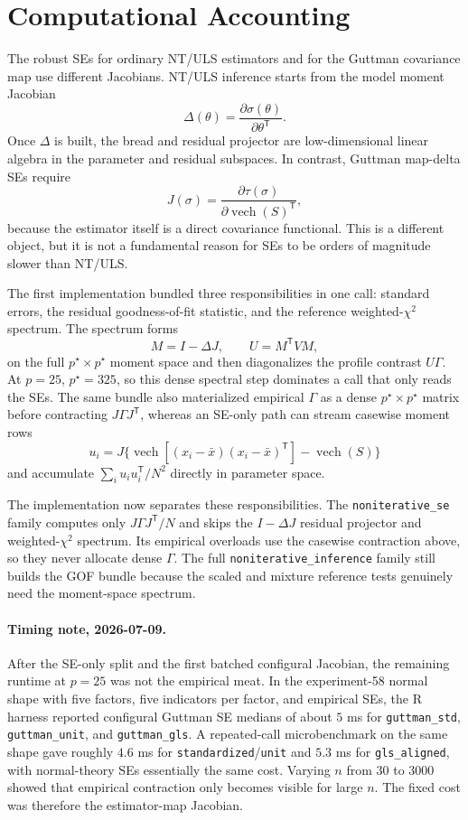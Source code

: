\documentclass[11pt]{article}
\newcommand{\T}{^{\mathsf T}}
\newcommand{\vech}{\operatorname{vech}}
\theoremstyle{plain}
\theoremstyle{remark}
\begin{document}
\section{Computational Accounting}

The robust SEs for ordinary NT/ULS estimators and for the Guttman covariance
map use different Jacobians. NT/ULS inference starts from the model moment
Jacobian
\[
  \Delta(\theta)=\frac{\partial\sigma(\theta)}{\partial\theta\T}.
\]
Once \(\Delta\) is built, the bread and residual projector are low-dimensional
linear algebra in the parameter and residual subspaces. In contrast, Guttman
map-delta SEs require
\[
  J(\sigma)=\frac{\partial\tau(\sigma)}{\partial\vech(S)\T},
\]
because the estimator itself is a direct covariance functional. This is a
different object, but it is not a fundamental reason for SEs to be orders of
magnitude slower than NT/ULS.

The first implementation bundled three responsibilities in one call:
standard errors, the residual goodness-of-fit statistic, and the reference
weighted-\(\chi^2\) spectrum. The spectrum forms
\[
  M = I-\Delta J,\qquad U=M\T V M,
\]
on the full \(p^\star\times p^\star\) moment space and then diagonalizes the
profile contrast \(U\Gamma\). At \(p=25\), \(p^\star=325\), so this dense
spectral step dominates a call that only reads the SEs. The same bundle also
materialized empirical \(\Gamma\) as a dense \(p^\star\times p^\star\) matrix
before contracting \(J\Gamma J\T\), whereas an SE-only path can stream
casewise moment rows
\[
  u_i = J\{\vech[(x_i-\bar x)(x_i-\bar x)\T]-\vech(S)\}
\]
and accumulate \(\sum_i u_i u_i\T/N^2\) directly in parameter space.

The implementation now separates these responsibilities. The
\texttt{noniterative\_se} family computes only \(J\Gamma J\T/N\) and skips the
\(I-\Delta J\) residual projector and weighted-\(\chi^2\) spectrum. Its
empirical overloads use the casewise contraction above, so they never allocate
dense \(\Gamma\). The full \texttt{noniterative\_inference} family still builds
the GOF bundle because the scaled and mixture reference tests genuinely need the
moment-space spectrum.

\paragraph{Timing note, 2026-07-09.}
After the SE-only split and the first batched configural Jacobian, the remaining
runtime at \(p=25\) was not the empirical meat. In the experiment-58 normal
shape with five factors, five indicators per factor, and empirical SEs, the R
harness reported configural Guttman SE medians of about \(5\) ms for
\texttt{guttman\_std}, \texttt{guttman\_unit}, and \texttt{guttman\_gls}. A
repeated-call microbenchmark on the same shape gave roughly \(4.6\) ms for
\texttt{standardized}/\texttt{unit} and \(5.3\) ms for
\texttt{gls\_aligned}, with normal-theory SEs essentially the same cost. Varying
\(n\) from \(30\) to \(3000\) showed that empirical contraction only becomes
visible for large \(n\). The fixed cost was therefore the estimator-map
Jacobian.
\end{document}
